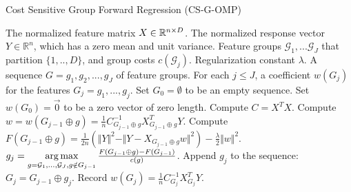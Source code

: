 \begin{algorithm}[tb]
\caption{Cost Sensitive Group Forward Regression (CS-G-OMP)}
 \label{algo:gfr_lm}
\begin{algorithmic}[1]
	 The normalized feature matrix $X \in \mathbb{R}^{n \times D}$.
 	The normalized response vector $Y \in \mathbb{R}^{n}$, which has a zero mean and unit variance. 
    Feature groups $\mathcal{G}_1, ... \mathcal{G}_J$ that partition $\{1,..,D\}$, and group costs $c(\mathcal{G}_j)$.
   Regularization constant $\lambda$.
	 A sequence $G = g_1, g_2, ..., g_{J}$ of feature groups.
   For each $j \leq J$, a coefficient  $w(G_j)$ for the features $G_j =g_1,..., g_j$. 
    \STATE Set $G_0 = \emptyset$ to be an empty sequence.
    \STATE Set $w(G_0) = \vec{0}$ to be a zero vector of zero length.
    \STATE Compute $C = X^TX$. 
        \STATE Compute $w = w(G_{j-1} \oplus g) =  \frac{1}{n}C_{G_{j-1} \oplus g}^{-1}X_{G_{j-1} \oplus g}^TY$.
        \STATE Compute $F(G_{j-1} \oplus g) = \frac{1}{2n}(\Vert Y \Vert ^2 - \Vert Y - X_{G_{j-1} \oplus g} w \Vert ^2) 
        	- \frac{\lambda}{2} \Vert w \Vert ^2$. 
    \ENDFOR
    \STATE $g_{j} = \operatorname*{arg\,max} \limits_{g = \mathcal{G}_1, ... , \mathcal{G}_J, g\notin G_{j-1}} 
	\frac{F(G_{j-1} \oplus g) - F(G_{j-1})}{c(g)}$.
   \STATE Append $g_j$ to the sequence: $G_{j} = G_{j-1} \oplus g_{j}$.
   \STATE Record $w(G_j) = \frac{1}{n}C_{G_{j}}^{-1}X_{G_{j}}^TY$.
 \ENDFOR
\end{algorithmic}
\end{algorithm}



